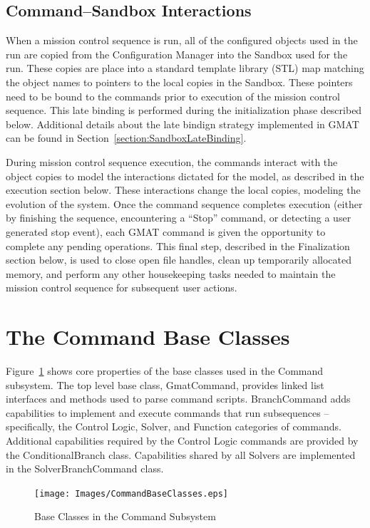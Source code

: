\subsection{Command--Sandbox Interactions}

When a mission control sequence is run, all of the configured objects used in the run are copied
from the Configuration Manager into the Sandbox used for the run.  These copies are place into a
standard template library (STL) map matching the object names to pointers to the local copies in
the Sandbox.  These pointers need to be bound to the commands prior to execution of the mission
control sequence.  This late binding is performed during the initialization phase described below.
Additional details about the late bindign strategy implemented in GMAT can be found in
Section~\ref{section:SandboxLateBinding}.

During mission control sequence execution, the commands interact with the object copies to model
the interactions dictated for the model, as described in the execution section below.  These
interactions change the local copies, modeling the evolution of the system.  Once the command
sequence completes execution (either by finishing the sequence, encountering a ``Stop'' command, or
detecting a user generated stop event), each GMAT command is given the opportunity to complete any
pending operations.  This final step, described in the Finalization section below, is used to close
open file handles, clean up temporarily allocated memory, and perform any other housekeeping tasks
needed to maintain the mission control sequence for subsequent user actions.

\section{The Command Base Classes}

Figure~\ref{figure:CommandBaseClasses} shows core properties of the base classes used in the Command
subsystem.  The top level base class, GmatCommand, provides linked list interfaces and methods used
to parse command scripts.  BranchCommand adds capabilities to implement and execute commands that
run subsequences -- specifically, the Control Logic, Solver, and Function categories of commands.
Additional capabilities required by the Control Logic commands are provided by the ConditionalBranch
class.  Capabilities shared by all Solvers are implemented in the SolverBranchCommand class.

\begin{figure}
\begin{center}
\texttt{[image: Images/CommandBaseClasses.eps]}
\caption{\label{figure:CommandBaseClasses}Base Classes in the Command Subsystem}
\end{center}
\end{figure}

